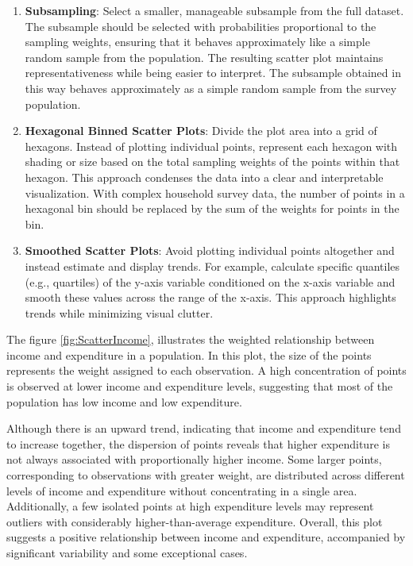 \documentclass[
  12pt,
]{book}
\begin{document}
\begin{enumerate}
\def\labelenumi{\arabic{enumi}.}
\item
  \textbf{Subsampling}: Select a smaller, manageable subsample from the full dataset. The subsample should be selected with probabilities proportional to the sampling weights, ensuring that it behaves approximately like a simple random sample from the population. The resulting scatter plot maintains representativeness while being easier to interpret. The subsample obtained in this way behaves approximately as a simple random sample from the survey population.
\item
  \textbf{Hexagonal Binned Scatter Plots}: Divide the plot area into a grid of hexagons. Instead of plotting individual points, represent each hexagon with shading or size based on the total sampling weights of the points within that hexagon. This approach condenses the data into a clear and interpretable visualization. With complex household survey data, the number of points in a hexagonal bin should be replaced by the sum of the weights for points in the bin.
\item
  \textbf{Smoothed Scatter Plots}: Avoid plotting individual points altogether and instead estimate and display trends. For example, calculate specific quantiles (e.g., quartiles) of the y-axis variable conditioned on the x-axis variable and smooth these values across the range of the x-axis. This approach highlights trends while minimizing visual clutter.
\end{enumerate}

The figure \ref{fig:ScatterIncome}, illustrates the weighted relationship between income and expenditure in a population. In this plot, the size of the points represents the weight assigned to each observation. A high concentration of points is observed at lower income and expenditure levels, suggesting that most of the population has low income and low expenditure.

Although there is an upward trend, indicating that income and expenditure tend to increase together, the dispersion of points reveals that higher expenditure is not always associated with proportionally higher income. Some larger points, corresponding to observations with greater weight, are distributed across different levels of income and expenditure without concentrating in a single area. Additionally, a few isolated points at high expenditure levels may represent outliers with considerably higher-than-average expenditure. Overall, this plot suggests a positive relationship between income and expenditure, accompanied by significant variability and some exceptional cases.
\end{document}
